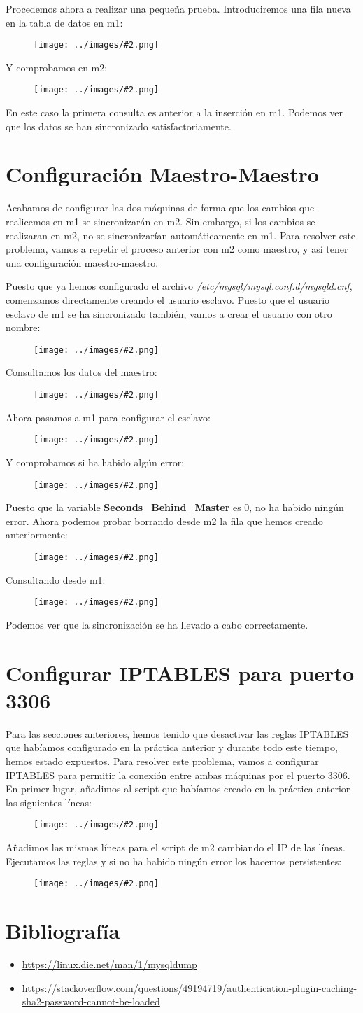 \documentclass[twoside]{article}
\newcommand{\image}[2]{
\begin{figure}[H]
    \texttt{[image: ../images/\#2.png]}
    \centering
\end{figure}
}
\begin{document}
Procedemos ahora a realizar una pequeña prueba. Introduciremos una fila nueva en la tabla de datos en m1:
\image{10}{22}
Y comprobamos en m2:
\image{10}{23}
En este caso la primera consulta es anterior a la inserción en m1. Podemos ver que los datos se han sincronizado satisfactoriamente. 

\section{Configuración Maestro-Maestro}
Acabamos de configurar las dos máquinas de forma que los cambios que realicemos en m1 se sincronizarán en m2. Sin embargo, si los cambios se realizaran en m2, no se sincronizarían automáticamente en m1. Para resolver este problema, vamos a repetir el proceso anterior con m2 como maestro, y así tener una configuración maestro-maestro.

Puesto que ya hemos configurado el archivo \textit{/etc/mysql/mysql.conf.d/mysqld.cnf}, comenzamos directamente creando el usuario esclavo. Puesto que el usuario esclavo de m1 se ha sincronizado también, vamos a crear el usuario con otro nombre:
\image{10}{24}
Consultamos los datos del maestro:
\image{10}{25}
Ahora pasamos a m1 para configurar el esclavo:
\image{10}{26}
Y comprobamos si ha habido algún error:
\image{10}{27}
Puesto que la variable \textbf{Seconds\_Behind\_Master} es 0, no ha habido ningún error. Ahora podemos probar borrando desde m2 la fila que hemos creado anteriormente:
\image{10}{28}
Consultando desde m1:
\image{10}{29}
Podemos ver que la sincronización se ha llevado a cabo correctamente.

\section{Configurar IPTABLES para puerto 3306}
Para las secciones anteriores, hemos tenido que desactivar las reglas IPTABLES que habíamos configurado en la práctica anterior y durante todo este tiempo, hemos estado expuestos. Para resolver este problema, vamos a configurar IPTABLES para permitir la conexión entre ambas máquinas por el puerto 3306. En primer lugar, añadimos al script que habíamos creado en la práctica anterior las siguientes líneas:
\image{10}{30}
Añadimos las mismas líneas para el script de m2 cambiando el IP de las líneas. Ejecutamos las reglas y si no ha habido ningún error los hacemos persistentes:
\image{10}{31}


\newpage
\section{Bibliografía}
\begin{itemize}
    \item \url{https://linux.die.net/man/1/mysqldump}
    \item \url{https://stackoverflow.com/questions/49194719/authentication-plugin-caching-sha2-password-cannot-be-loaded}
    
\end{itemize}
\end{document}
